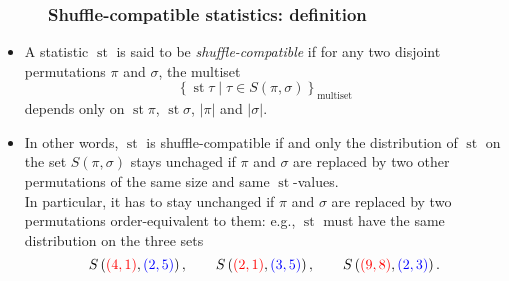 \documentclass{beamer}
\newcommand{\red}{\color{red}}
\newcommand{\blue}{\color{blue}}
\newcommand{\st}{\operatorname{st}}
\newcommand{\fti}[1]{\frametitle{\ \ \ \ \ #1}}
\newcommand{\set}[1]{\left\{ #1 \right\}}
\newcommand{\abs}[1]{\left| #1 \right|}
\newcommand{\tup}[1]{\left( #1 \right)}
\newcommand{\defn}[1]{{\color{darkred}\emph{#1}}} %
\theoremstyle{plain}
\begin{document}
\begin{frame}
\fti{Shuffle-compatible statistics: definition}

\begin{itemize}

\item A statistic $\st$ is said to be \defn{shuffle-compatible}
      if for any two disjoint permutations $\pi$ and $\sigma$, the
      multiset
      \[
      \set{ \st\tau \mid \tau\in S\tup{\pi, \sigma} }_{\text{multiset}}
      \]
      depends only on $\st \pi$, $\st \sigma$, $\abs{\pi}$ and
      $\abs{\sigma}$.

\pause

\item In other words, $\st$ is shuffle-compatible if and only
      the distribution of
      $\st$ on the set $S \tup{ \pi , \sigma }$
      stays unchaged if $\pi$ and $\sigma$ are replaced by two
      other permutations of the same size and same $\st$-values.
      \pause \\
      In particular, it has to stay unchanged if $\pi$ and $\sigma$
      are replaced by two permutations order-equivalent to them:
      e.g., $\st$ must have the same distribution
      on the three sets
      \[
      S \tup{ {\red \tup{4, 1}} , {\blue \tup{2, 5}} },
      \qquad S \tup{ {\red \tup{2, 1}} , {\blue \tup{3, 5}} } ,
      \qquad S \tup{ {\red \tup{9, 8}} , {\blue \tup{2, 3}} } .
      \]

\end{itemize}

\end{frame}
\end{document}

